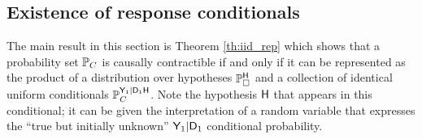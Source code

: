 






\subsection{Existence of response conditionals}

The main result in this section is Theorem \ref{th:iid_rep} which shows that a probability set $\mathbb{P}_C$ is causally contractible if and only if it can be represented as the product of a distribution over hypotheses $\mathbb{P}_\square^{\mathsf{H}}$ and a collection of identical uniform conditionals $\mathbb{P}_C^{\mathsf{Y}_1|\mathsf{D}_1\mathsf{H}}$. Note the hypothesis $\mathsf{H}$ that appears in this conditional; it can be given the interpretation of a random variable that expresses the ``true but initially unknown'' $\mathsf{Y}_1|\mathsf{D}_1$ conditional probability.


